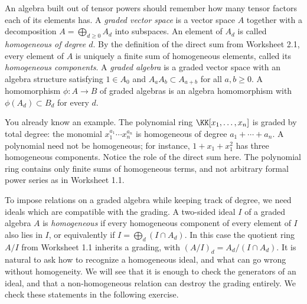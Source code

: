 \documentclass[12pt,reqno]{amsart}
\begin{document}
\hrulefill

An algebra built out of tensor powers should remember how many tensor factors each of its elements has. A \emph{graded vector space} is a vector space $A$ together with a decomposition $A=\bigoplus_{d\geq0}A_d$ into subspaces. An element of $A_d$ is called \emph{homogeneous of degree $d$}. By the definition of the direct sum from Worksheet 2.1, every element of $A$ is uniquely a finite sum of homogeneous elements, called its \emph{homogeneous components}. A \emph{graded algebra} is a graded vector space with an algebra structure satisfying $1\in A_0$ and $A_aA_b\subset A_{a+b}$ for all $a,b\geq0$. A homomorphism $\phi:A\to B$ of graded algebras is an algebra homomorphism with $\phi(A_d)\subset B_d$ for every $d$.

You already know an example. The polynomial ring $\KK[x_1,\ldots,x_n]$ is graded by total degree: the monomial $x_1^{a_1}\cdots x_n^{a_n}$ is homogeneous of degree $a_1+\cdots+a_n$. A polynomial need not be homogeneous; for instance, $1+x_1+x_1^2$ has three homogeneous components. Notice the role of the direct sum here. The polynomial ring contains only finite sums of homogeneous terms, and not arbitrary formal power series as in Worksheet 1.1.

To impose relations on a graded algebra while keeping track of degree, we need ideals which are compatible with the grading. A two-sided ideal $I$ of a graded algebra $A$ is \emph{homogeneous} if every homogeneous component of every element of $I$ also lies in $I$, or equivalently if $I=\bigoplus_d(I\cap A_d)$. In this case the quotient ring $A/I$ from Worksheet 1.1 inherits a grading, with $(A/I)_d=A_d/(I\cap A_d)$. It is natural to ask how to recognize a homogeneous ideal, and what can go wrong without homogeneity. We will see that it is enough to check the generators of an ideal, and that a non-homogeneous relation can destroy the grading entirely. We check these statements in the following exercise.

\hrulefill
\end{document}
